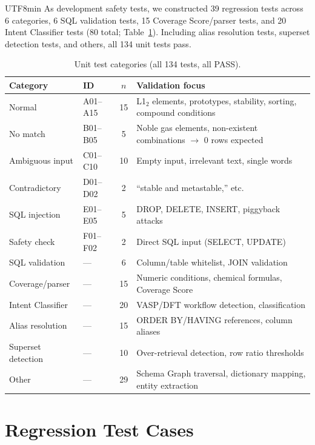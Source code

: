 \documentclass[sn-mathphys,Numbered]{sn-jnl}
\begin{document}
\begin{CJK}{UTF8}{min}
As development safety tests, we constructed 39 regression tests
across 6 categories, 6 SQL validation tests, 15 Coverage
Score/parser tests, and 20 Intent Classifier tests (80 total;
Table~\ref{tab:sup_test_categories}).
Including alias resolution tests, superset detection tests, and
others, all 134 unit tests pass.

\begin{table}[htbp]
\centering
\caption{Unit test categories (all 134 tests, all PASS).}
\label{tab:sup_test_categories}
\small
\begin{tabularx}{\textwidth}{llcX}
  \toprule
  Category & ID & $n$ & Validation focus \\
  \midrule
  Normal & A01--A15 & 15 & L1$_2$ elements, prototypes, stability, sorting, compound conditions \\
  No match & B01--B05 & 5 & Noble gas elements, non-existent combinations $\to$ 0 rows expected \\
  Ambiguous input & C01--C10 & 10 & Empty input, irrelevant text, single words \\
  Contradictory & D01--D02 & 2 & ``stable and metastable,'' etc. \\
  SQL injection & E01--E05 & 5 & DROP, DELETE, INSERT, piggyback attacks \\
  Safety check & F01--F02 & 2 & Direct SQL input (SELECT, UPDATE) \\
  SQL validation & --- & 6 & Column/table whitelist, JOIN validation \\
  Coverage/parser & --- & 15 & Numeric conditions, chemical formulas, Coverage Score \\
  Intent Classifier & --- & 20 & VASP/DFT workflow detection, classification \\
  Alias resolution & --- & 15 & ORDER BY/HAVING references, column aliases \\
  Superset detection & --- & 10 & Over-retrieval detection, row ratio thresholds \\
  Other & --- & 29 & Schema Graph traversal, dictionary mapping, entity extraction \\
  \bottomrule
\end{tabularx}
\end{table}

\section{Regression Test Cases}
\label{sec:sup_all_tests}


\end{CJK}
\end{document}
